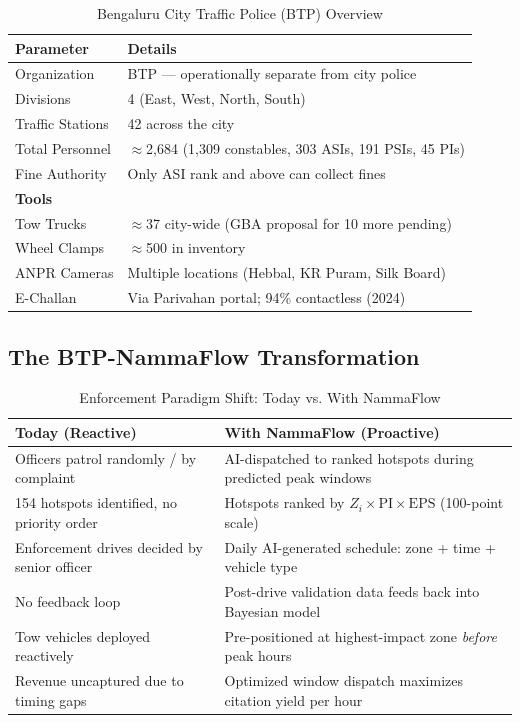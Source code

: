 \documentclass[12pt,a4paper]{article}
\begin{document}
\begin{table}[H]
\centering
\caption{Bengaluru City Traffic Police (BTP) Overview}
\begin{tabular}{ll}
\toprule
\textbf{Parameter} & \textbf{Details} \\
\midrule
Organization & BTP — operationally separate from city police \\
Divisions & 4 (East, West, North, South) \\
Traffic Stations & 42 across the city \\
Total Personnel & $\approx$2,684 (1,309 constables, 303 ASIs, 191 PSIs, 45 PIs) \\
Fine Authority & Only ASI rank and above can collect fines \\
\midrule
\textbf{Tools} & \\
Tow Trucks & $\approx$37 city-wide (GBA proposal for 10 more pending) \\
Wheel Clamps & $\approx$500 in inventory \\
ANPR Cameras & Multiple locations (Hebbal, KR Puram, Silk Board) \\
E-Challan & Via Parivahan portal; 94\% contactless (2024) \\
\bottomrule
\end{tabular}
\end{table}

\subsection{The BTP-NammaFlow Transformation}

\begin{table}[H]
\centering
\caption{Enforcement Paradigm Shift: Today vs. With NammaFlow}
\begin{tabular}{p{6cm}p{7cm}}
\toprule
\textbf{Today (Reactive)} & \textbf{With NammaFlow (Proactive)} \\
\midrule
Officers patrol randomly / by complaint & AI-dispatched to ranked hotspots during predicted peak windows \\
154 hotspots identified, no priority order & Hotspots ranked by $Z_i \times \text{PI} \times \text{EPS}$ (100-point scale) \\
Enforcement drives decided by senior officer & Daily AI-generated schedule: zone + time + vehicle type \\
No feedback loop & Post-drive validation data feeds back into Bayesian model \\
Tow vehicles deployed reactively & Pre-positioned at highest-impact zone \textit{before} peak hours \\
Revenue uncaptured due to timing gaps & Optimized window dispatch maximizes citation yield per hour \\
\bottomrule
\end{tabular}
\end{table}
\end{document}
